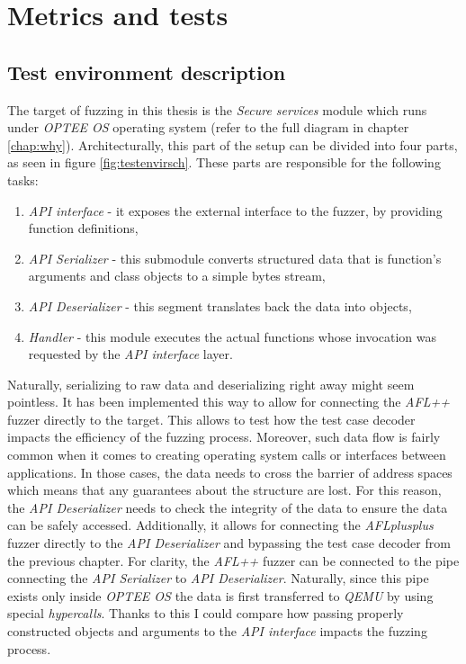 \cleardoublepage
\section{Metrics and tests} \label{chap:tests}

\subsection{Test environment description}

The target of fuzzing in this thesis is the \textit{Secure services} module which runs under \textit{OPTEE OS} operating system (refer to the full diagram in chapter \ref{chap:why}). Architecturally, this part of the setup can be divided into four parts, as seen in figure \ref{fig:testenvirsch}. These parts are responsible for the following tasks:
\begin{enumerate}
    \item \textit{API interface} - it exposes the external interface to the fuzzer, by providing function definitions,
    \item \textit{API Serializer} - this submodule converts structured data that is function's arguments and class objects to a simple bytes stream,
    \item \textit{API Deserializer} - this segment translates back the data into objects,
    \item \textit{Handler} - this module executes the actual functions whose invocation was requested by the \textit{API interface} layer.
\end{enumerate}
Naturally, serializing to raw data and deserializing right away might seem pointless. It has been implemented this way to allow for connecting the \textit{AFL++} fuzzer directly to the target. 
This allows to test how the test case decoder impacts the efficiency of the fuzzing process.
Moreover, such data flow is fairly common when it comes to creating operating system calls or interfaces between applications. In those cases, the data needs to cross the barrier of address spaces which means that any guarantees about the structure are lost. For this reason, the \textit{API Deserializer} needs to check the integrity of the data to ensure the data can be safely accessed. Additionally, it allows for connecting the \textit{AFLplusplus} fuzzer directly to the \textit{API Deserializer} and bypassing the test case decoder from the previous chapter. For clarity, the \textit{AFL++} fuzzer can be connected to the pipe connecting the \textit{API Serializer} to \textit{API Deserializer}. Naturally, since this pipe exists only inside \textit{OPTEE OS} the data is first transferred to \textit{QEMU} by using special \textit{hypercalls}. Thanks to this I could compare how passing properly constructed objects and arguments to the \textit{API interface} impacts the fuzzing process.

